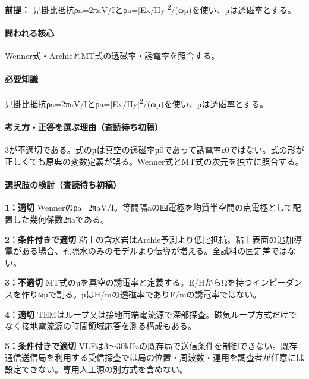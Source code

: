 \noindent\textbf{前提：} 見掛比抵抗ρa=\allowbreak{}2πaV/Iとρa=|Ex/Hy|\textsuperscript{2}/(ωµ)を使い、µは透磁率とする。\par

\paragraph{問われる核心} Wenner式・ArchieとMT式の透磁率・誘電率を照合する。

\paragraph{必要知識} 見掛比抵抗ρa=\allowbreak{}2πaV/Iとρa=|Ex/Hy|\textsuperscript{2}/(ωµ)を使い、µは透磁率とする。

\paragraph{考え方・正答を選ぶ理由（査読待ち初稿）} 3が不適切である。式のµは真空の透磁率µ0であって誘電率ε0ではない。式の形が正しくても原典の変数定義が誤る。Wenner式とMT式の次元を独立に照合する。

\paragraph{選択肢の検討（査読待ち初稿）}\mbox{}\par

\noindent\textbf{1：適切} Wennerのρa=\allowbreak{}2πaV/I。等間隔aの四電極を均質半空間の点電極として配置した幾何係数2πaである。\par

\noindent\textbf{2：条件付きで適切} 粘土の含水岩はArchie予測より低比抵抗。粘土表面の追加導電がある場合、孔隙水のみのモデルより伝導が増える。全試料の固定差ではない。\par

\noindent\textbf{3：不適切} MT式のµを真空の誘電率と定義する。E/HからΩを持つインピーダンスを作りωµで割る。µはH/mの透磁率でありF/mの誘電率ではない。\par

\noindent\textbf{4：適切} TEMはループ又は接地両端電流源で深部探査。磁気ループ方式だけでなく接地電流源の時間領域応答を測る構成もある。\par

\noindent\textbf{5：条件付きで適切} VLFは3〜30kHzの既存局で送信条件を制御できない。既存通信送信局を利用する受信探査では局の位置・周波数・運用を調査者が任意には設定できない。専用人工源の別方式を含めない。\par

